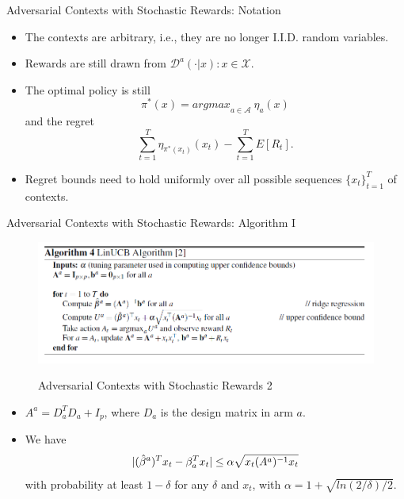 \documentclass[english]{article}
\begin{document}
\item {Adversarial Contexts with Stochastic Rewards: Notation}
    \begin{itemize}
        \item The contexts are arbitrary, i.e., they are no longer I.I.D. random variables.
        \item Rewards are still drawn from $\mathcal{D}^a(\cdot | x): x \in \mathcal{X}$.
        \item The optimal policy is still \[
        \pi^\ast(x) = \textit{argmax}_{a \in \mathcal{A}}~\eta_a(x)
        \] and the regret \[
        \sum_{t = 1}^T \eta_{\pi^\ast(x_t)}(x_t) - \sum_{t = 1}^T E[R_t].
        \]
        \item Regret bounds need to hold uniformly over all possible sequences $\{x_t\}_{t = 1}^T$ of contexts.
    \end{itemize}


\item {Adversarial Contexts with Stochastic Rewards: Algorithm I}
    \begin{figure}
        \centering
        \includegraphics[scale = 0.45]{Alg_3.PNG}
                \label{Adversarial Contexts with Stochastic Rewards 1}
        \caption{Adversarial Contexts with Stochastic Rewards 2}
    \end{figure}
    
\begin{itemize}
\item $A^a = D_a^T D_a + I_p$, where $D_a$ is the design matrix in arm $a$.
\item We have \[
|(\Hat{\beta}^a)^T x_t - \beta_a^T x_t| \leq \alpha \sqrt{x_t (A^a)^{-1} x_t}
\] with probability at least $1 - \delta$ for any $\delta$ and $x_t$, with $\alpha = 1 + \sqrt{ln(2/\delta)/2}$.
\end{itemize}
\end{document}

